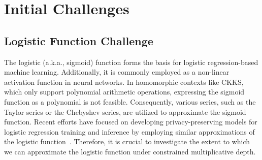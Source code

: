 \documentclass[journal=tosc,final]{iacrtrans}
\begin{document}
\section{Initial Challenges}



\subsection{Logistic Function Challenge}
The logistic (a.k.a., sigmoid) function forms the basis for logistic regression-based machine learning. Additionally, it is commonly employed as a non-linear activation function in neural networks. In homomorphic contexts like CKKS, which only support polynomial arithmetic operations, expressing the sigmoid function as a polynomial is not feasible. Consequently, various series, such as the Taylor series or the Chebyshev series, are utilized to approximate the sigmoid function. Recent efforts have focused on developing privacy-preserving models for logistic regression training and inference by employing similar approximations of the logistic function~\cite{lr1,lr2,lr3,lr4}. Therefore, it is crucial to investigate the extent to which we can approximate the logistic function under constrained multiplicative depth. 
\end{document}
